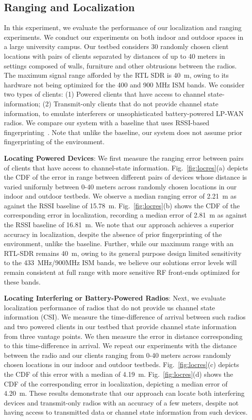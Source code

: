 \subsection{Ranging and Localization} 
In this experiment, we evaluate the performance of our localization and ranging experiments. We conduct our experiments on both indoor and outdoor spaces in a large university campus. Our testbed considers  30 randomly chosen client locations with pairs of clients separated by distances of up to 40 meters in settings composed of walls, furniture and other obtrusions between the radios. The maximum signal range afforded by the RTL SDR is 40~m, owing to its hardware not being optimized for the 400 and 900 MHz ISM bands. We consider two types of clients: (1) Powered clients that have access to channel state-information; (2) Transmit-only clients that do not provide channel state information, to emulate interferers or unsophisticated battery-powered LP-WAN radios.  We compare our system with a baseline that uses RSSI-based fingerprinting~\cite{rssi}. Note that unlike the baseline, our system does not assume prior fingerprinting of the environment. 

\noindent\textbf{Locating Powered Devices}: We first measure the ranging error between pairs of clients that have access to channel-state information. Fig.~\ref{fig:locres}(a) depicts the CDF of the error in range between different pairs of devices whose distance is varied uniformly between 0-40 meters across randomly chosen locations in our indoor and outdoor testbeds. We observe a median ranging error of 2.21~m as against the RSSI baseline of 15.78~m. Fig.~\ref{fig:locres}(b) shows the CDF of the corresponding error in localization, recording a median error of 2.81~m as against the RSSI baseline of 16.81~m. We note that our approach achieves a superior accuracy in localization, despite the absence of prior fingerprinting of the environment, unlike the baseline. Further, while our maximum range with an RTL-SDR remains 40~m, owing to its general purpose design limited sensitivity to the 433~MHz/900MHz ISM bands, we believe our solutions error levels will remain consistent at full range with more sensitive RF front-ends optimized for these bands. 

\noindent\textbf{Locating Interfering or Battery-Powered Radios}: Next, we  evaluate localization performance of radios that do not provide us channel state information (CSI). We measure the time-difference of arrival between such radios and two powered clients in our testbed that provide channel state information from three vantage points. We then measure the error in distance corresponding to this time-difference in arrival. We repeat our experiments with the distance between the radio and our clients ranging from 0-40 meters across randomly chosen locations in our indoor and outdoor testbeds. Fig.~\ref{fig:locres}(c) depicts the CDF of this error  with a median of 4.19~m. Fig.~\ref{fig:locres}(d) shows the CDF of the corresponding error in localization, depicting a median error of 4.20~m. These results demonstrate that our approach can locate both interfering devices and transmit-only radios with an accuracy of a few meters, despite not having access to transmitted data or channel state information from such devices.   


